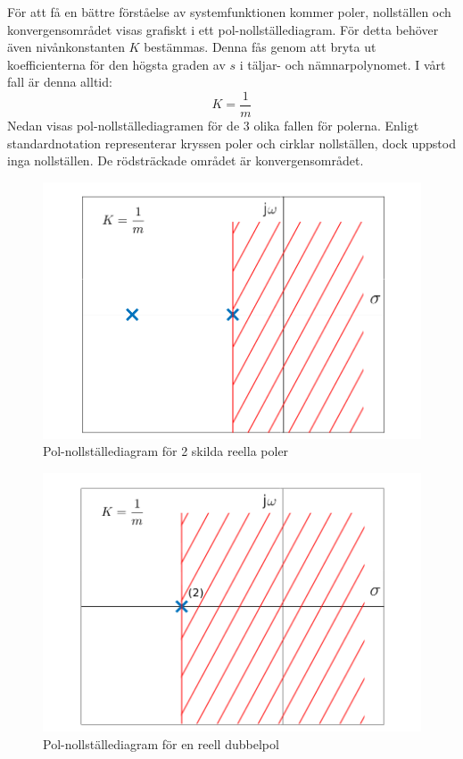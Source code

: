 För att få en bättre förståelse av systemfunktionen kommer poler, nollställen och konvergensområdet visas grafiskt i ett pol-nollställediagram. För detta behöver även nivånkonstanten $K$ bestämmas. Denna fås genom att bryta ut koefficienterna för den högsta graden av $s$ i täljar- och nämnarpolynomet. I vårt fall är denna alltid:
$$K=\frac{1}{m}$$
Nedan visas pol-nollställediagramen för de 3 olika fallen för polerna. Enligt standardnotation representerar kryssen poler och cirklar nollställen, dock uppstod inga nollställen. De rödsträckade området är konvergensområdet.

\begin{figure}[H] %
    \centering
    \includegraphics[scale=0.33]{bilder/pol_nollstallediagram_2_poler}
    \caption{Pol-nollställediagram för 2 skilda reella poler}
    \label{fig:pol_nollstallediagram_2_poler}
\end{figure}
\begin{figure}[H] %
    \centering
    \includegraphics[scale=0.33]{bilder/pol_nollstallediagram_dubbelpol}
    \caption{Pol-nollställediagram för en reell dubbelpol}
    \label{fig:pol_nollstallediagram_dubbelpol}
\end{figure}
